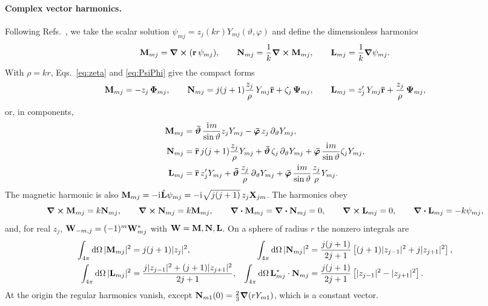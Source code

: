 \documentclass[
    pra,
    aps,
    reprint,
    onecolumn,
    amsmath,amssymb,
    a4paper,
    superscriptaddress,
    10pt,
    nofootinbib
]{revtex4-2}
\newcommand{\iu}{\mathrm{i}\mkern1mu}                 %
\newcommand{\ort}[1]{\boldsymbol{\mathbf{\bar{#1}}}}  %
\newcommand{\jj}{j(j+1)}
\begin{document}
\paragraph{Complex vector harmonics.}
Following Refs.~\cite{Thesis,Toftul2023PRL}, we take the scalar solution $\psi_{mj} = z_j(kr) Y_{mj}(\vartheta, \varphi)$ and define the dimensionless harmonics
\begin{equation}
    \vb{M}_{mj} = \curl(\vb{r}\, \psi_{mj}), \qquad
    \vb{N}_{mj} = \frac{1}{k}\curl\vb{M}_{mj}, \qquad
    \vb{L}_{mj} = \frac{1}{k}\grad\psi_{mj} .
    \label{eq:MNL_def}
\end{equation}
With $\rho = kr$, Eqs.~\eqref{eq:zeta} and \eqref{eq:PsiPhi} give the compact forms
\begin{equation}
    \vb{M}_{mj} = -z_j\, \vb{\Phi}_{mj}, \qquad
    \vb{N}_{mj} = \jj \frac{z_j}{\rho}\, Y_{mj}\ort{r} + \zeta_j\, \vb{\Psi}_{mj}, \qquad
    \vb{L}_{mj} = z_j'\, Y_{mj}\ort{r} + \frac{z_j}{\rho}\, \vb{\Psi}_{mj},
    \label{eq:MNL}
\end{equation}
or, in components,
\begin{align}
    \vb{M}_{mj} &= \ort{\vartheta}\, \frac{\iu m}{\sin\vartheta} z_j Y_{mj} - \ort{\varphi}\, z_j\, \partial_\vartheta Y_{mj}, \nonumber \\
    \vb{N}_{mj} &= \ort{r}\, \jj \frac{z_j}{\rho} Y_{mj} + \ort{\vartheta}\, \zeta_j\, \partial_\vartheta Y_{mj} + \ort{\varphi}\, \frac{\iu m}{\sin\vartheta} \zeta_j Y_{mj},
    \label{eq:MNL_comp} \\
    \vb{L}_{mj} &= \ort{r}\, z_j' Y_{mj} + \ort{\vartheta}\, \frac{z_j}{\rho}\, \partial_\vartheta Y_{mj} + \ort{\varphi}\, \frac{\iu m}{\sin\vartheta} \frac{z_j}{\rho} Y_{mj} . \nonumber
\end{align}
The magnetic harmonic is also $\vb{M}_{mj} = -\iu\hat{\vb{L}}\psi_{mj} = -\iu\sqrt{\jj}\, z_j \vb{X}_{jm}$.
The harmonics obey
\begin{equation}
    \curl\vb{M}_{mj} = k\vb{N}_{mj}, \qquad
    \curl\vb{N}_{mj} = k\vb{M}_{mj}, \qquad
    \div\vb{M}_{mj} = \div\vb{N}_{mj} = 0, \qquad
    \curl\vb{L}_{mj} = 0, \qquad
    \div\vb{L}_{mj} = -k\psi_{mj},
    \label{eq:MNL_identities}
\end{equation}
and, for real $z_j$, $\vb{W}_{-m,j} = (-1)^m \vb{W}^*_{mj}$ with $\vb{W} = \vb{M}, \vb{N}, \vb{L}$.
On a sphere of radius $r$ the nonzero integrals are~\cite{Stratton2007,Thesis}
\begin{align}
    \int_{4\pi}\dd\Omega\, |\vb{M}_{mj}|^2 &= \jj |z_j|^2, &
    \int_{4\pi}\dd\Omega\, |\vb{N}_{mj}|^2 &= \frac{\jj}{2j+1}\left[(j+1)|z_{j-1}|^2 + j|z_{j+1}|^2\right], \nonumber \\
    \int_{4\pi}\dd\Omega\, |\vb{L}_{mj}|^2 &= \frac{j|z_{j-1}|^2 + (j+1)|z_{j+1}|^2}{2j+1}, &
    \int_{4\pi}\dd\Omega\, \vb{L}^*_{mj}\cdot\vb{N}_{mj} &= \frac{\jj}{2j+1}\left[|z_{j-1}|^2 - |z_{j+1}|^2\right] .
    \label{eq:MNL_norms}
\end{align}
At the origin the regular harmonics vanish, except $\vb{N}_{m1}(0) = \frac{2}{3}\grad(r Y_{m1})$, which is a constant vector.
\end{document}
